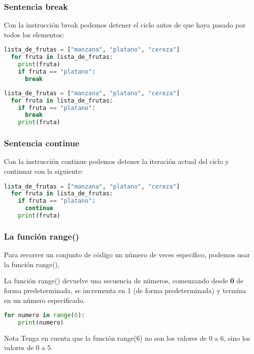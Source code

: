 \begin{frame}[fragile]
  \frametitle{Sentencia \textbf{break}}

  \vspace{\baselineskip}
  Con la instrucción \textcolor{codeKeyword}{break} podemos detener el ciclo
  antes de que haya pasado por todos los elementos:

  \vspace{\baselineskip}
  \begin{lstlisting}[language=Python]
  lista_de_frutas = ["manzana", "platano", "cereza"]
  for fruta in lista_de_frutas:
    print(fruta)
    if fruta == "platano":
      break
  \end{lstlisting}

  \pausa
  \begin{lstlisting}[language=Python]
  lista_de_frutas = ["manzana", "platano", "cereza"]
  for fruta in lista_de_frutas:
    if fruta == "platano":
      break
    print(fruta)
  \end{lstlisting}
\end{frame}

\begin{frame}[fragile]
  \frametitle{Sentencia \textbf{continue}}

  Con la instrucción \textcolor{codeKeyword}{continue} podemos detener
  la iteración actual del ciclo y continuar con la siguiente:

  \vspace{\baselineskip}
  \begin{lstlisting}[language=Python]
  lista_de_frutas = ["manzana", "platano", "cereza"]
  for fruta in lista_de_frutas:
    if fruta == "platano":
      continue
    print(fruta)
  \end{lstlisting}
\end{frame}

\begin{frame}[fragile]
  \frametitle{La función \textbf{range}()}

  Para recorrer un conjunto de código un número de veces específico,
  podemos usar la función \textcolor{codeKeyword}{range}(),

  \vspace{\baselineskip}
  La función \textcolor{codeKeyword}{range}() devuelve una secuencia
  de números, comenzando desde \textbf{0} de forma predeterminada,
  se incrementa en 1 (de forma predeterminada) y termina en un
  número especificado.

  \vspace{\baselineskip}
  \begin{lstlisting}[language=Python]
  for numero in range(6):
    print(numero)
  \end{lstlisting}

  \pausa
  \begin{alertblock}{Nota}
  Tenga en cuenta que la función range(6) no son los valores de 0 a 6,
  sino los valores de 0 a 5.
  \end{alertblock}
\end{frame}

